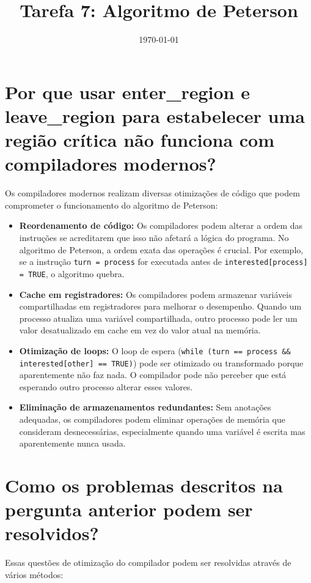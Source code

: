 \documentclass[12pt]{article}
\title{Tarefa 7: Algoritmo de Peterson}
\author{}
\date{\today}
\begin{document}
\maketitle
\pagebreak
\section{Por que usar enter\_region e leave\_region para estabelecer uma região crítica não funciona com compiladores modernos?}

Os compiladores modernos realizam diversas otimizações de código que podem comprometer o funcionamento do algoritmo de Peterson:

\begin{itemize}
    \item \textbf{Reordenamento de código:} Os compiladores podem alterar a ordem das instruções se acreditarem que isso não afetará a lógica do programa. No algoritmo de Peterson, a ordem exata das operações é crucial. Por exemplo, se a instrução \texttt{turn = process} for executada antes de \texttt{interested[process] = TRUE}, o algoritmo quebra.

    \item \textbf{Cache em registradores:} Os compiladores podem armazenar variáveis compartilhadas em registradores para melhorar o desempenho. Quando um processo atualiza uma variável compartilhada, outro processo pode ler um valor desatualizado em cache em vez do valor atual na memória.

    \item \textbf{Otimização de loops:} O loop de espera (\texttt{while (turn == process \&\& interested[other] == TRUE)}) pode ser otimizado ou transformado porque aparentemente não faz nada. O compilador pode não perceber que está esperando outro processo alterar esses valores.

    \item \textbf{Eliminação de armazenamentos redundantes:} Sem anotações adequadas, os compiladores podem eliminar operações de memória que consideram desnecessárias, especialmente quando uma variável é escrita mas aparentemente nunca usada.
\end{itemize}
\pagebreak
\section{Como os problemas descritos na pergunta anterior podem ser resolvidos?}

Essas questões de otimização do compilador podem ser resolvidas através de vários métodos:
\end{document}
